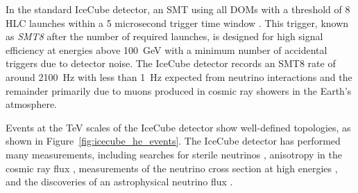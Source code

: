 In the standard IceCube detector, an SMT using all DOMs with a threshold of 8 HLC launches within a 5 microsecond trigger time window \cite{Description-IceCube}.
This trigger, known as \emph{SMT8} after the number of required launches, is designed for high signal efficiency at energies above 100~GeV with a minimum number of accidental triggers due to detector noise.
The IceCube detector records an SMT8 rate of around 2100~Hz with less than 1~Hz expected from neutrino interactions and the remainder primarily due to muons produced in cosmic ray showers in the Earth's atmosphere.

Events at the TeV scales of the IceCube detector show well-defined topologies, as shown in Figure~\ref{fig:icecube_he_events}.
The IceCube detector has performed many measurements, including searches for sterile neutrinos \cite{IceCubeSterile-IC86-1}, anisotropy in the cosmic ray flux \cite{IceCube-CRAnisotropy}, measurements of the neutrino cross section at high energies \cite{IceCube-Xsec}, and the discoveries of an astrophysical neutrino flux \cite{IceCube-HESE6}.

